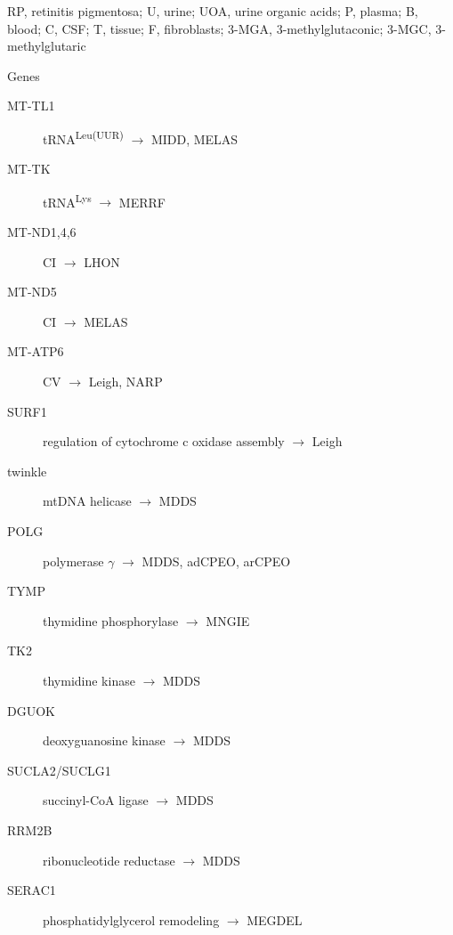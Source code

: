 \documentclass[landscape]{article}
\begin{document}
\begin{description}
\item[{Abbreviations}] RP, retinitis pigmentosa; U, urine; UOA, urine
organic acids; P, plasma; B, blood; C, CSF; T, tissue; F,
fibroblasts; 3-MGA, 3-methylglutaconic; 3-MGC, 3-methylglutaric

\item Genes
\begin{description}
\item[{MT-TL1}] tRNA\textsuperscript{Leu(UUR)} \(\to\) MIDD, MELAS
\item[{MT-TK}] tRNA\textsuperscript{Lys} \(\to\) MERRF
\item[{MT-ND1,4,6}] CI \(\to\) LHON
\item[{MT-ND5}] CI \(\to\) MELAS
\item[{MT-ATP6}] CV \(\to\) Leigh, NARP
\item[{SURF1}] regulation of cytochrome c oxidase assembly \(\to\) Leigh
\item[{twinkle}] mtDNA helicase \(\to\) MDDS
\item[{POLG}] polymerase \(\gamma\) \(\to\) MDDS, adCPEO, arCPEO
\item[{TYMP}] thymidine phosphorylase \(\to\) MNGIE
\item[{TK2}] thymidine kinase \(\to\) MDDS
\item[{DGUOK}] deoxyguanosine kinase \(\to\) MDDS
\item[{SUCLA2/SUCLG1}] succinyl-CoA ligase  \(\to\) MDDS
\item[{RRM2B}] ribonucleotide reductase \(\to\) MDDS
\item[{SERAC1}] phosphatidylglycerol remodeling \(\to\) MEGDEL
\end{description}
\end{description}
\end{document}
